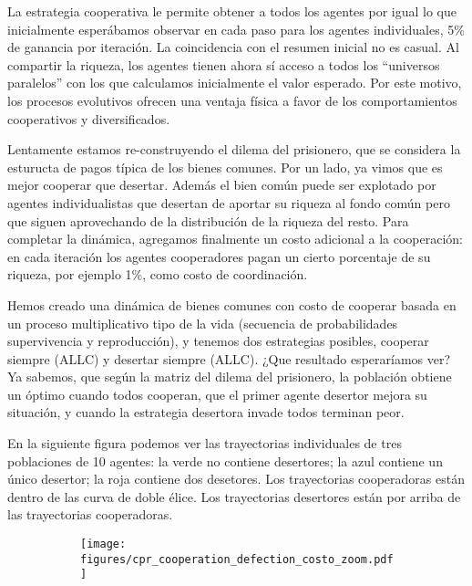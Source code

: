 \documentclass[a4paper,10pt]{article}
\begin{document}
La estrategia cooperativa le permite obtener a todos los agentes por igual lo que inicialmente esperábamos observar en cada paso para los agentes individuales, 5\% de ganancia por iteración.
La coincidencia con el resumen inicial no es casual.
Al compartir la riqueza, los agentes tienen ahora sí acceso a todos los ``universos paralelos'' con los que calculamos inicialmente el valor esperado.
Por este motivo, los procesos evolutivos ofrecen una ventaja física a favor de los comportamientos cooperativos y diversificados.


Lentamente estamos re-construyendo el dilema del prisionero, que se considera la esturucta de pagos típica de los bienes comunes.
Por un lado, ya vimos que es mejor cooperar que desertar.
Además el bien común puede ser explotado por agentes individualistas que desertan de aportar su riqueza al fondo común pero que siguen aprovechando de la distribución de la riqueza del resto.
Para completar la dinámica, agregamos finalmente un costo adicional a la cooperación: en cada iteración los agentes cooperadores pagan un cierto porcentaje de su riqueza, por ejemplo 1\%, como costo de coordinación.


Hemos creado una dinámica de bienes comunes con costo de cooperar basada en un proceso multiplicativo tipo de la vida (secuencia de probabilidades supervivencia y reproducción), y tenemos dos estrategias posibles, cooperar siempre (ALLC) y desertar siempre (ALLC).
¿Que resultado esperaríamos ver?
Ya sabemos, que según la matriz del dilema del prisionero, la población obtiene un óptimo cuando todos cooperan, que el primer agente desertor mejora su situación, y cuando la estrategia desertora invade todos terminan peor.


En la siguiente figura podemos ver las trayectorias individuales de tres poblaciones de 10 agentes: la verde no contiene desertores; la azul contiene un único desertor; la roja contiene dos desetores.
Los trayectorias cooperadoras están dentro de las curva de doble élice.
Los trayectorias desertores están por arriba de las trayectorias cooperadoras.

\begin{figure}[H]
    \centering
    \begin{subfigure}[b]{0.45\textwidth}
    \texttt{[image: figures/cpr\_cooperation\_defection\_costo\_zoom.pdf]}
    \end{subfigure}
    \caption{}
    \label{fig:cpr_cooperation_defection_costo_zoom}
\end{figure}
\end{document}
